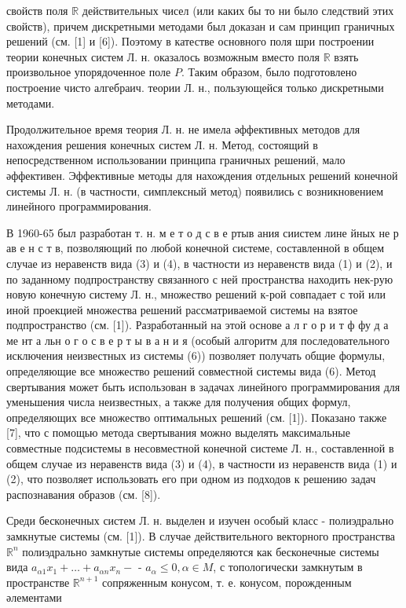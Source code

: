 \documentclass[10pt]{article}
\begin{document}
свойств поля $\mathbb{R}$ действительных чисел (или каких бы то ни было следствий этих свойств), причем дискретными методами был доказан и сам принцип граничных решений (см. [1] и [6]). Поэтому в катестве основного поля шри построении теории конечных систем Л. н. оказалось возможным вместо поля $\mathbb{R}$ взять произвольное упорядоченное поле $P$. Таким образом, было подготовлено построение чисто алгебраич. теории Л. н., пользующейся только дискретными методами.



Продолжительное время теория Л. н. не имела әффективных методов для нахождения решения конечных систем Л. н. Метод, состоящий в непосредственном использовании принципа граничных решений, мало әффективен. Эффективные методы для нахождения отдельных решений конечной системы Л. н. (в частности, симплексный метод) появились с возникновением линейного программирования.



В 1960-65 был разработан т. н. м е т о д с в е ртыв ания сиистем лине йных не р ав е н с т в, позволяющий по любой конечной системе, составленной в общем случае из неравенств вида (3) и (4), в частности из неравенств вида (1) и (2), и по заданному подпространству связанного с ней пространства находить нек-рую новую конечную систему Л. н., множество решений к-рой совпадает с той или иной проекцией множества решений рассматриваемой системы на взятое подпространство (см. [1]). Разработанный на этой основе а л г о р и т ф фу д а ме нт а льн о г о с в е р т ы в а н и я (особый алгоритм для последовательного исключения неизвестных из системы (6)) позволяет получать общие формулы, определяющие все множество решений совместной системы вида (6). Метод свертывания может быть использован в задачах линейного программирования для уменьшения числа неизвестных, а также для получения общих формул, определяющих все множество оптимальных решений (см. [1]). Показано также [7], что с помощью метода свертывания можно выделять максимальные совместные подсистемы в несовместной конечной системе Л. н., составленной в общем случае из неравенств вида (3) и (4), в частности из неравенств вида (1) и (2), что позволяет использовать его при одном из подходов к решению задач распознавания образов (см. [8]).



Среди бесконечных систем Л. н. выделен и изучен особый класс - полиэдрально замкнутые системы (см. [1]). В случае действительного векторного пространства $\mathbb{R}^{n}$ полиэдрально замкнутые системы определяются как бесконечные системы вида $a_{\alpha 1} x_{1}+\ldots+a_{\alpha n} x_{n}-$ - $a_{\alpha} \leqslant 0, \alpha \in M$, с топологически замкнутым в пространстве $\mathbb{R}^{n+1}$ сопряженным конусом, т. е. конусом, порожденным әлементами
\end{document}
